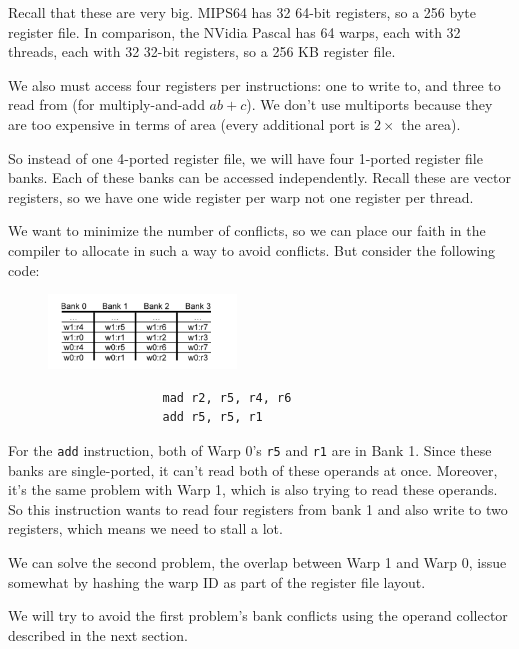 \documentclass{article}
\begin{document}
Recall that these are very big. MIPS64 has 32 64-bit registers, so a 256 byte register file. In comparison, the NVidia Pascal has 64 warps, each with 32 threads, each with 32 32-bit registers, so a 256 KB register file.

We also must access four registers per instructions: one to write to, and three to read from (for multiply-and-add $ab+c$). We don't use multiports because they are too expensive in terms of area (every additional port is $2\times$ the area). 

So instead of one 4-ported register file, we will have four 1-ported register file banks. Each of these banks can be accessed independently. Recall these are vector registers, so we  have one wide register per warp not one register per thread. 

We want to minimize the number of conflicts, so we can place our faith in the compiler to allocate in such a way to avoid conflicts. But consider the following code:

 \begin{figure}[ht!]
\centering
\includegraphics[width=50mm]{img/banks.png}

\scriptsize

\begin{verbatim}
                mad r2, r5, r4, r6
                add r5, r5, r1 
\end{verbatim}
\normalsize

\end{figure}

For the \texttt{add} instruction, both of Warp 0's \texttt{r5} and \texttt{r1} are in Bank 1. Since these banks are single-ported, it can't read both of these operands at once. Moreover, it's the same problem with Warp 1, which is also trying to read these operands. So this instruction wants to read four  registers from bank 1 and also write to two registers, which means we need to stall a lot. 

We can solve the second problem, the overlap between Warp 1 and Warp 0, issue somewhat by hashing the warp ID as part of the register file layout. 

We will try to avoid the first problem's bank conflicts using the operand collector described in the next section.
\end{document}
